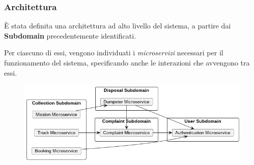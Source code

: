 \begin{frame}
    \frametitle{Architettura}
    È stata definita una architettura ad alto livello del sistema, a partire dai \textbf{Subdomain} precedentemente
    identificati.

    \bigskip

    Per ciascuno di essi, vengono individuati i \textit{microservizi} necessari per il funzionamento del sistema,
    specificando anche le interazioni che avvengono tra essi.

    \smallskip

    \begin{figure}[H]
        \centering
        \includegraphics[width=0.8\linewidth]{../img/global-architectural-map}
    \end{figure}

\end{frame}
